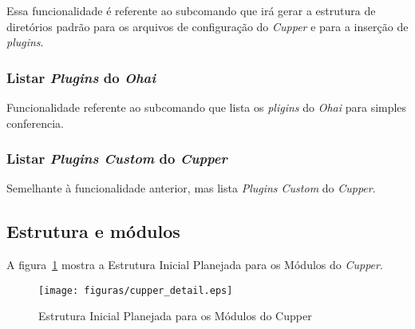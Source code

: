 Essa funcionalidade é referente ao subcomando que irá gerar a estrutura de
diretórios padrão para os arquivos de configuração do \textit{Cupper} e para
a inserção de \textit{plugins}.

\subsubsection{Listar \textit{Plugins} do \textit{Ohai}}

Funcionalidade referente ao subcomando que lista os \textit{pligins} do \textit{Ohai}
para simples conferencia.

\subsubsection{Listar \textit{Plugins Custom} do \textit{Cupper}}

Semelhante à funcionalidade anterior, mas lista \textit{Plugins Custom} do 
\textit{Cupper}.

\subsection{Estrutura e módulos}

A figura~\ref{fig:cupper-detail} mostra a Estrutura Inicial Planejada para os 
Módulos do \textit{Cupper}.

\begin{figure}[H]
  \centering
  \texttt{[image: figuras/cupper\_detail.eps]}
  \caption{Estrutura Inicial Planejada para os Módulos do Cupper}
  \label{fig:cupper-detail}
\end{figure}

